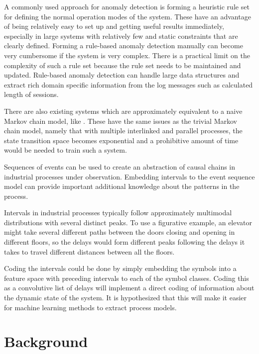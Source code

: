\documentclass[a4paper,10pt]{article}
\begin{document}
A commonly used approach for anomaly detection is forming a heuristic rule set for defining the normal operation modes of the system. These have an advantage of being
relatively easy
to set up and getting useful results immediately, especially in large systems with relatively few and static constraints that are clearly defined.
Forming a rule-based anomaly detection manually can become very cumbersome if the system is very complex. There is a practical limit on the complexity of such a rule set because
the rule set needs to be maintained and updated. Rule-based anomaly detection can handle large data structures and extract rich domain specific information from
the log messages such as calculated length of sessions.

There are also existing systems which are approximately equivalent to a naive Markov chain model, like \cite{langer2011self}. These have the same issues as the trivial Markov
chain model, namely that with multiple interlinked and parallel processes, the state transition space becomes exponential and a prohibitive amount of time would be needed
to train such a system.

Sequences of events can be used to create an abstraction of causal chains in industrial processes under observation. Embedding intervals to the event sequence model
can provide important additional knowledge about the patterns in the process.

Intervals in industrial processes typically follow approximately multimodal distributions with several distinct peaks.
To use a figurative example, an elevator might take several different paths between the doors closing and opening in different floors, so the delays would form different
peaks following the delays it takes to travel different distances between all the floors.

Coding the intervals could be done by simply embedding the symbols into a feature space with preceding intervals to
each of the symbol classes. Coding this as a convolutive list of delays will implement a direct coding of information about the dynamic state of the system. It is hypothesized that
this will make it easier for machine learning methods to extract process models.

\section{Background}
\end{document}

